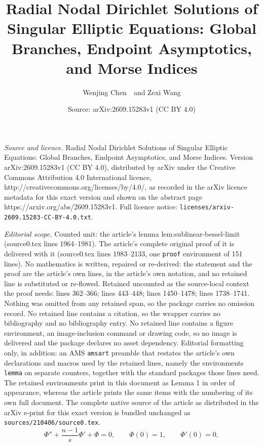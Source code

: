 \documentclass[10pt,a4paper]{amsart}
\title{Radial Nodal Dirichlet Solutions of Singular Elliptic Equations: Global Branches, Endpoint Asymptotics, and Morse Indices}
\author{Wenjing Chen\ \ and Zexi Wang}
\date{Source: arXiv:2609.15283v1 (CC BY 4.0)}
\begin{document}
\maketitle

\noindent\emph{Source and licence.} Radial Nodal Dirichlet Solutions of Singular Elliptic Equations: Global Branches, Endpoint Asymptotics, and Morse Indices. Version arXiv:2609.15283v1 (CC BY 4.0), distributed by arXiv under the Creative Commons Attribution 4.0 International licence, http://creativecommons.org/licenses/by/4.0/, as recorded in the arXiv licence metadata for this exact version and shown on the abstract page https://arxiv.org/abs/2609.15283v1. Full licence notice: \texttt{licenses/arxiv-2609.15283-CC-BY-4.0.txt}.\par\smallskip

\noindent\textit{Editorial scope.} Counted unit: the article's lemma lem:sublinear-bessel-limit (source0.tex lines 1964--1981). The article's complete original proof of it is delivered with it (source0.tex lines 1983--2133, one \texttt{proof} environment of 151 lines). No mathematics is written, repaired or re-derived: the statement and the proof are the article's own lines, in the article's own notation, and no retained line is substituted or re-flowed.  Retained uncounted as the source-local context the proof needs: lines 362--366; lines 443--448; lines 1450--1478; lines 1738--1741.  Nothing was omitted from any retained span, so the package carries no omission record.  No retained line contains a citation, so the wrapper carries no bibliography and no bibliography entry.  No retained line contains a figure environment, an image-inclusion command or drawing code, so no image is delivered and the package declares no asset dependency.  Editorial formatting only, in addition: an AMS \texttt{amsart} preamble that restates the article's own declarations and macros used by the retained lines, namely the environments \texttt{lemma} on separate counters, together with the standard packages those lines need.  The retained environments print in this document as Lemma 1 in order of appearance, whereas the article prints the same items with the numbering of its own full document.  The complete native source of the article as distributed in the arXiv e-print for this exact version is bundled unchanged as \texttt{sources/210406/source0.tex}.
\begin{equation}\label{eq:main-bessel}
\Phi''+\frac{n-1}{s}\Phi'+\Phi=0,
\qquad \Phi(0)=1,
\qquad \Phi'(0)=0,
\end{equation}
\end{document}
